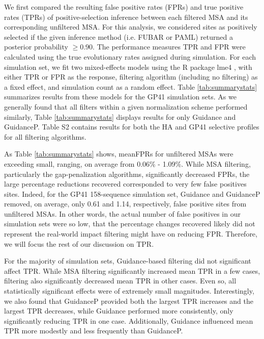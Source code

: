 \documentclass[11pt]{article}
\begin{document}
We first compared the resulting false positive rates (FPRs) and true positive rates (TPRs) of positive-selection inference between each filtered MSA and its corresponding unfiltered MSA. For this analysis, we considered sites as positively selected if the given inference method (i.e. FUBAR or PAML) returned a posterior probability $\geq0.90$. The performance measures TPR and FPR were calculated using the true evolutionary rates assigned during simulation. For each simulation set, we fit two mixed-effects models using the R package lme4 \citep{Bates2012}, with either TPR or FPR as the response, filtering algorithm (including no filtering) as a fixed effect, and simulation count as a random effect. Table \ref{tab:summarystats} summarizes results from these models for the GP41 simulation sets. As we generally found that all filters within a given normalization scheme performed similarly, Table \ref{tab:summarystats} displays results for only Guidance and GuidanceP. Table S2 contains results for both the HA and GP41 selective profiles for all filtering algorithms.

As Table \ref{tab:summarystats} shows, meanFPRs for unfiltered MSAs were exceeding small, ranging, on average from 0.06\% - 1.09\%. While MSA filtering, particularly the gap-penalization algorithms, significantly decreased FPRs, the large percentage reductions recovered corresponded to very few false positives sites. Indeed, for the GP41 158-sequence simulation set, Guidance and GuidanceP removed, on average, only 0.61 and 1.14, respectively, false positive sites from unfiltered MSAs. In other words, the actual number of false positives in our simulation sets were so low, that the percentage changes recovered likely did not represent the real-world impact filtering might have on reducing FPR. Therefore, we will focus the rest of our discussion on TPR.

For the majority of simulation sets, Guidance-based filtering did not significant affect TPR. While MSA filtering significantly increased mean TPR in a few cases, filtering also significantly decreased mean TPR in other cases. Even so, all statistically significant effects were of extremely small magnitudes. Interestingly, we also found that GuidanceP provided both the largest TPR increases and the largest TPR decreases, while Guidance performed more consistently, only significantly reducing TPR in one case. Additionally, Guidance influenced mean TPR more modestly and less frequently than GuidanceP.
\end{document}
